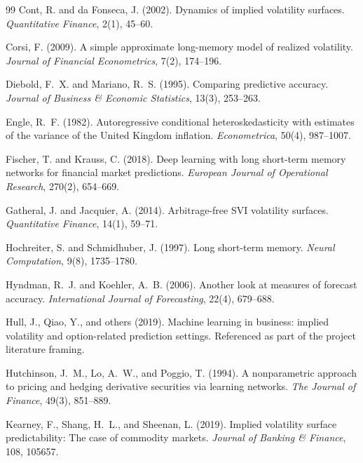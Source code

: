 \documentclass[12pt]{report}
\begin{document}
\begin{thebibliography}{99}
Cont, R. and da Fonseca, J. (2002).
\newblock Dynamics of implied volatility surfaces.
\newblock \emph{Quantitative Finance}, 2(1), 45--60.

Corsi, F. (2009).
\newblock A simple approximate long-memory model of realized volatility.
\newblock \emph{Journal of Financial Econometrics}, 7(2), 174--196.

Diebold, F.~X. and Mariano, R.~S. (1995).
\newblock Comparing predictive accuracy.
\newblock \emph{Journal of Business \& Economic Statistics}, 13(3), 253--263.

Engle, R.~F. (1982).
\newblock Autoregressive conditional heteroskedasticity with estimates of the variance of the United Kingdom inflation.
\newblock \emph{Econometrica}, 50(4), 987--1007.

Fischer, T. and Krauss, C. (2018).
\newblock Deep learning with long short-term memory networks for financial market predictions.
\newblock \emph{European Journal of Operational Research}, 270(2), 654--669.

Gatheral, J. and Jacquier, A. (2014).
\newblock Arbitrage-free SVI volatility surfaces.
\newblock \emph{Quantitative Finance}, 14(1), 59--71.

Hochreiter, S. and Schmidhuber, J. (1997).
\newblock Long short-term memory.
\newblock \emph{Neural Computation}, 9(8), 1735--1780.

Hyndman, R.~J. and Koehler, A.~B. (2006).
\newblock Another look at measures of forecast accuracy.
\newblock \emph{International Journal of Forecasting}, 22(4), 679--688.

Hull, J., Qiao, Y., and others (2019).
\newblock Machine learning in business: implied volatility and option-related prediction settings.
\newblock Referenced as part of the project literature framing.

Hutchinson, J.~M., Lo, A.~W., and Poggio, T. (1994).
\newblock A nonparametric approach to pricing and hedging derivative securities via learning networks.
\newblock \emph{The Journal of Finance}, 49(3), 851--889.

Kearney, F., Shang, H.~L., and Sheenan, L. (2019).
\newblock Implied volatility surface predictability: The case of commodity markets.
\newblock \emph{Journal of Banking \& Finance}, 108, 105657.


\end{thebibliography}
\end{document}
